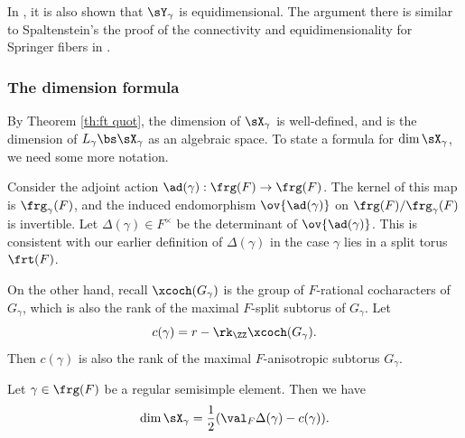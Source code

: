In \cite{KL}, it is also shown that $\sY_{\gamma}$ is equidimensional. The argument there is similar to Spaltenstein's the proof of the connectivity and equidimensionality for Springer fibers in \cite{Spa77}.


\subsubsection{The dimension formula}
By Theorem \ref{th:ft quot}, the dimension of $\sX_{\gamma}$ is well-defined, and is the dimension of $L_{\gamma}\bs\sX_{\gamma}$ as an algebraic space. To state a formula for $\dim\sX_{\gamma}$, we need some more notation.

Consider the adjoint action $\ad(\gamma):\frg(F)\to \frg(F)$. The kernel of this map is $\frg_{\gamma}(F)$, and the induced endomorphism $\ov{\ad(\gamma)}$ on $\frg(F)/\frg_{\gamma}(F)$ is invertible. Let $\Delta(\gamma)\in F^{\times}$ be the determinant of $\ov{\ad(\gamma)}$. This is consistent with our earlier definition of $\Delta(\gamma)$ in the case $\gamma$ lies in a split torus $\frt(F)$.

On the other hand, recall $\xcoch(G_{\gamma})$ is the group of $F$-rational cocharacters of $G_{\gamma}$, which is also the rank of the maximal $F$-split subtorus of $G_{\gamma}$. Let
\begin{equation*}
c(\gamma)=r-\rk_{\ZZ}\xcoch(G_{\gamma}).
\end{equation*}
Then $c(\gamma)$ is also the rank of the maximal $F$-anisotropic subtorus $G_{\gamma}$.

\begin{theorem}\label{th:aff dim} Let $\gamma\in \frg(F)$ be a regular semisimple element. Then we have 
\begin{equation}\label{aff Spr dim}
\dim\sX_{\gamma}=\frac{1}{2}(\val_{F}\Delta(\gamma)-c(\gamma)).
\end{equation}
\end{theorem}



